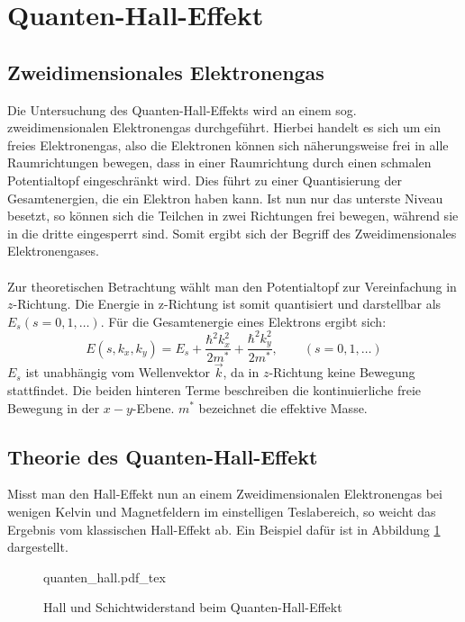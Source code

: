 \section{Quanten-Hall-Effekt}
\subsection{Zweidimensionales Elektronengas}

Die Untersuchung des Quanten-Hall-Effekts wird an einem sog. zweidimensionalen
Elektronengas durchgeführt. Hierbei handelt es sich um ein freies Elektronengas, 
also die Elektronen können sich näherungsweise frei in alle Raumrichtungen bewegen,
dass in einer Raumrichtung durch einen schmalen Potentialtopf eingeschränkt wird.
Dies führt zu einer Quantisierung der Gesamtenergien, die ein Elektron haben kann.
Ist nun nur das unterste Niveau besetzt, so können sich die Teilchen in zwei 
Richtungen frei bewegen, während sie in die dritte eingesperrt sind. Somit ergibt
sich der Begriff des Zweidimensionales Elektronengases.\\\\
Zur theoretischen Betrachtung wählt man den Potentialtopf zur Vereinfachung in 
$z$-Richtung. Die Energie in z-Richtung ist somit quantisiert und darstellbar als
$E_{s} (s=0,1,\dots)$. Für die Gesamtenergie eines Elektrons ergibt sich:
\[
	E(s,k_{x},k_{y}) = E_{s} + \frac{\hbar^{2} k_{x}^{2}}{2m^{*}}
					   + \frac{\hbar^{2} k_{y}^{2}}{2m^{*}}, \qquad{}
	(s=0,1,\dots)
\]
$E_{s}$ ist unabhängig vom Wellenvektor $\vec{k}$, da in $z$-Richtung keine 
Bewegung stattfindet. Die beiden hinteren Terme beschreiben die kontinuierliche
freie Bewegung in der $x-y$-Ebene. $m^{*}$ bezeichnet die effektive Masse.

\subsection{Theorie des Quanten-Hall-Effekt}

Misst man den Hall-Effekt nun an einem Zweidimensionalen Elektronengas bei wenigen
Kelvin und Magnetfeldern im einstelligen Teslabereich, so weicht das Ergebnis vom
klassischen Hall-Effekt ab. Ein Beispiel dafür ist in Abbildung \ref{Abb:qhe} 
dargestellt.

\begin{figure}[ht]
    \centering
    \def\svgwidth{0.6\linewidth}
    {quanten_hall.pdf_tex}
    \caption{Hall und Schichtwiderstand beim Quanten-Hall-Effekt \cite{nobelqhe}}
    \label{Abb:qhe}
\end{figure}

